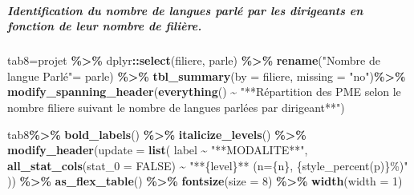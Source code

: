\documentclass[
]{article}
\newenvironment{Shaded}{\begin{snugshade}}{\end{snugshade}}
\newcommand{\AttributeTok}[1]{\textcolor[rgb]{0.13,0.29,0.53}{#1}}
\newcommand{\ConstantTok}[1]{\textcolor[rgb]{0.56,0.35,0.01}{#1}}
\newcommand{\DecValTok}[1]{\textcolor[rgb]{0.00,0.00,0.81}{#1}}
\newcommand{\FunctionTok}[1]{\textcolor[rgb]{0.13,0.29,0.53}{\textbf{#1}}}
\newcommand{\NormalTok}[1]{#1}
\newcommand{\OtherTok}[1]{\textcolor[rgb]{0.56,0.35,0.01}{#1}}
\newcommand{\SpecialCharTok}[1]{\textcolor[rgb]{0.81,0.36,0.00}{\textbf{#1}}}
\newcommand{\StringTok}[1]{\textcolor[rgb]{0.31,0.60,0.02}{#1}}
\begin{document}
\hypertarget{identification-du-nombre-de-langues-parluxe9-par-les-dirigeants-en-fonction-de-leur-nombre-de-filiuxe8re.}{%
\subparagraph{Identification du nombre de langues parlé par les
dirigeants en fonction de leur nombre de
filière.}\label{identification-du-nombre-de-langues-parluxe9-par-les-dirigeants-en-fonction-de-leur-nombre-de-filiuxe8re.}}

\hfill\break

\begin{Shaded}
\begin{Highlighting}[]
\NormalTok{tab8}\OtherTok{=}\NormalTok{projet }\SpecialCharTok{\%\textgreater{}\%}
\NormalTok{  dplyr}\SpecialCharTok{::}\FunctionTok{select}\NormalTok{(filiere, parle) }\SpecialCharTok{\%\textgreater{}\%}
    \FunctionTok{rename}\NormalTok{(}\StringTok{"Nombre de langue Parlé"}\OtherTok{=}\NormalTok{ parle) }\SpecialCharTok{\%\textgreater{}\%} 
    \FunctionTok{tbl\_summary}\NormalTok{(}\AttributeTok{by =}\NormalTok{ filiere, }\AttributeTok{missing =} \StringTok{"no"}\NormalTok{)}\SpecialCharTok{\%\textgreater{}\%}
       \FunctionTok{modify\_spanning\_header}\NormalTok{(}\FunctionTok{everything}\NormalTok{() }\SpecialCharTok{\textasciitilde{}} 
                                \StringTok{"**Répartition des PME selon le nombre  }
\StringTok{                              filiere suivant le nombre de langues }
\StringTok{                              parlées par dirigeant**"}\NormalTok{)}

\NormalTok{tab8}\SpecialCharTok{\%\textgreater{}\%} \FunctionTok{bold\_labels}\NormalTok{() }\SpecialCharTok{\%\textgreater{}\%} 
  \FunctionTok{italicize\_levels}\NormalTok{()  }\SpecialCharTok{\%\textgreater{}\%} 
  \FunctionTok{modify\_header}\NormalTok{(}\AttributeTok{update =} \FunctionTok{list}\NormalTok{( label }\SpecialCharTok{\textasciitilde{}} \StringTok{"**MODALITE**"}\NormalTok{, }
                               \FunctionTok{all\_stat\_cols}\NormalTok{(}\AttributeTok{stat\_0 =} \ConstantTok{FALSE}\NormalTok{) }\SpecialCharTok{\textasciitilde{}} 
                                 \StringTok{"**\{level\}** (n=\{n\}, \{style\_percent(p)\}\%)"}
\NormalTok{  )) }\SpecialCharTok{\%\textgreater{}\%}  \FunctionTok{as\_flex\_table}\NormalTok{() }\SpecialCharTok{\%\textgreater{}\%}
  \FunctionTok{fontsize}\NormalTok{(}\AttributeTok{size =} \DecValTok{8}\NormalTok{) }\SpecialCharTok{\%\textgreater{}\%}
  \FunctionTok{width}\NormalTok{(}\AttributeTok{width =} \DecValTok{1}\NormalTok{)}
\end{Highlighting}
\end{Shaded}
\end{document}

